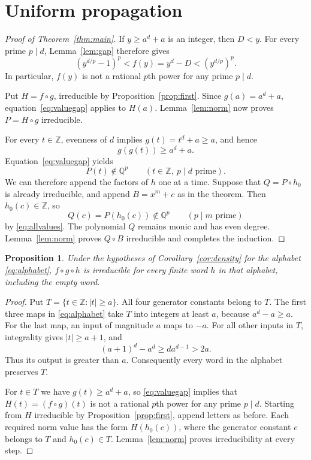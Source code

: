 \documentclass[11pt]{article}
\newtheorem{proposition}[theorem]{Proposition}
\theoremstyle{remark}
\newcommand{\Q}{\mathbb{Q}}
\newcommand{\Z}{\mathbb{Z}}
\begin{document}
\section{Uniform propagation}
\begin{proof}[Proof of Theorem~\ref{thm:main}]
If $y\geq a^d+a$ is an integer, then $D<y$. For every prime $p\mid d$, Lemma~\ref{lem:gap} therefore gives
\begin{equation}\label{eq:valuegap}
 (y^{d/p}-1)^p<f(y)=y^d-D<(y^{d/p})^p.
\end{equation}
In particular, $f(y)$ is not a rational $p$th power for any prime $p\mid d$.

Put $H=f\circ g$, irreducible by Proposition~\ref{prop:first}. Since $g(a)=a^d+a$, equation~\eqref{eq:valuegap} applies to $H(a)$. Lemma~\ref{lem:norm} now proves $P=H\circ g$ irreducible.

For every $t\in\Z$, evenness of $d$ implies $g(t)=t^d+a\geq a$, and hence
\[
 g(g(t))\geq a^d+a.
\]
Equation~\eqref{eq:valuegap} yields
\begin{equation}\label{eq:allvalues}
 P(t)\notin\Q^p\qquad(t\in\Z,\ p\mid d\text{ prime}).
\end{equation}
We can therefore append the factors of $h$ one at a time. Suppose that $Q=P\circ h_0$ is already irreducible, and append $B=x^m+c$ as in the theorem. Then $h_0(c)\in\Z$, so
\[
 Q(c)=P(h_0(c))\notin\Q^p\qquad(p\mid m\text{ prime})
\]
by \eqref{eq:allvalues}. The polynomial $Q$ remains monic and has even degree. Lemma~\ref{lem:norm} proves $Q\circ B$ irreducible and completes the induction.
\end{proof}

\begin{proposition}\label{prop:short}
Under the hypotheses of Corollary~\ref{cor:density} for the alphabet \eqref{eq:alphabet}, $f\circ g\circ h$ is irreducible for every finite word $h$ in that alphabet, including the empty word.
\end{proposition}
\begin{proof}
Put $T=\{t\in\Z:|t|\geq a\}$. All four generator constants belong to $T$. The first three maps in \eqref{eq:alphabet} take $T$ into integers at least $a$, because $a^d-a\geq a$. For the last map, an input of magnitude $a$ maps to $-a$. For all other inputs in $T$, integrality gives $|t|\geq a+1$, and
\[
 (a+1)^d-a^d\geq d a^{d-1}>2a.
\]
Thus its output is greater than $a$. Consequently every word in the alphabet preserves $T$.

For $t\in T$ we have $g(t)\geq a^d+a$, so \eqref{eq:valuegap} implies that $H(t)=(f\circ g)(t)$ is not a rational $p$th power for any prime $p\mid d$. Starting from $H$ irreducible by Proposition~\ref{prop:first}, append letters as before. Each required norm value has the form $H(h_0(c))$, where the generator constant $c$ belongs to $T$ and $h_0(c)\in T$. Lemma~\ref{lem:norm} proves irreducibility at every step.
\end{proof}
\end{document}
